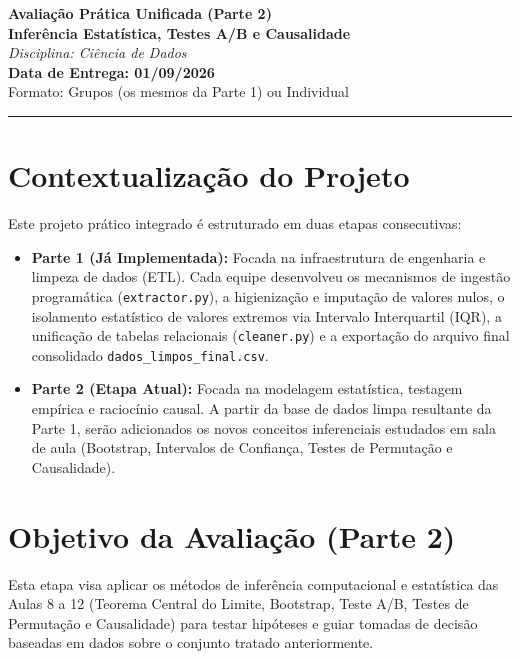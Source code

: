 \documentclass[12pt,a4paper]{article}
\begin{document}
	
	\noindent
	\begin{center}
		\LARGE \textbf{Avaliação Prática Unificada (Parte 2)} \\
		\vspace{0.2cm}
		\large \textbf{Inferência Estatística, Testes A/B e Causalidade} \\
		\vspace{0.4cm}
		\normalsize \textit{Disciplina: Ciência de Dados} \\
		\textbf{Data de Entrega: 01/09/2026} \\
		\normalsize Formato: Grupos (os mesmos da Parte 1) ou Individual
	\end{center}
	
	\vspace{0.2cm}
	\noindent\rule{\textwidth}{0.4pt}
	\vspace{0.5cm}
	
	\section{Contextualização do Projeto}
	Este projeto prático integrado é estruturado em duas etapas consecutivas:
	\begin{itemize}
		\item \textbf{Parte 1 (Já Implementada):} Focada na infraestrutura de engenharia e limpeza de dados (ETL). Cada equipe desenvolveu os mecanismos de ingestão programática (\texttt{extractor.py}), a higienização e imputação de valores nulos, o isolamento estatístico de valores extremos via Intervalo Interquartil (IQR), a unificação de tabelas relacionais (\texttt{cleaner.py}) e a exportação do arquivo final consolidado \texttt{dados\_limpos\_final.csv}.
		\item \textbf{Parte 2 (Etapa Atual):} Focada na modelagem estatística, testagem empírica e raciocínio causal. A partir da base de dados limpa resultante da Parte 1, serão adicionados os novos conceitos inferenciais estudados em sala de aula (Bootstrap, Intervalos de Confiança, Testes de Permutação e Causalidade).
	\end{itemize}

	\section{Objetivo da Avaliação (Parte 2)}
	Esta etapa visa aplicar os métodos de inferência computacional e estatística das Aulas 8 a 12 (Teorema Central do Limite, Bootstrap, Teste A/B, Testes de Permutação e Causalidade) para testar hipóteses e guiar tomadas de decisão baseadas em dados sobre o conjunto tratado anteriormente.
	
\end{document}
